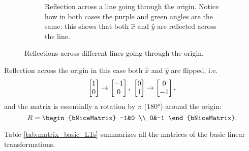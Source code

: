 \begin{descitemize}
\begin{figure}
\begin{subfigure}[c]{0.45\textwidth}
\begin{center}
			\end{center}
			\caption{Reflection across a line going through the origin. Notice how in both cases the purple and green angles are the same: this shows that both $\hat{x}$ and $\hat{y}$ are reflected across the line.}
			\label{fig:ref_line}
			\end{subfigure}
			\caption{Reflections across different lines going through the origin.}
			\label{fig:reflections}
		\end{figure}
		
	\item[Reflection across the origin] in this case both $\hat{x}$ and $\hat{y}$ are flipped, i.e.
		\[
			\colvec{1;0}\to\colvec{-1;0},\ \colvec{0;1}\to\colvec{0;-1},
		\]
		and the matrix is essentially a rotation by $\pi$ ($\ang{180}$) around the origin:
		\begin{equation}
			R = \begin{bNiceMatrix} -1&0 \\ 0&-1 \end{bNiceMatrix}.
			\label{eq:}
		\end{equation}
\end{descitemize}

Table \autoref{tab:matrix_basic_LTs} summarizes all the matrices of the basic linear transformations.

